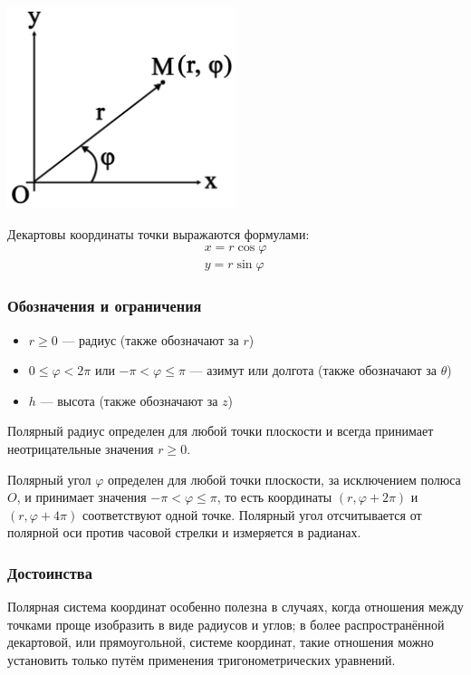 \documentclass[a4paper,12pt]{extbook}
\theoremstyle{named}
\theoremstyle{named}
\begin{document}
\begin{center}
    \includegraphics[width=0.5\textwidth]{polar_system.png}
\end{center}

Декартовы координаты точки выражаются формулами:
\begin{gather*}
    x = r \cos{\varphi} \\
    y = r \sin{\varphi}
\end{gather*}

\subsubsection*{Обозначения и ограничения}
\begin{itemize}
    \item {\(r \geq 0\) — радиус (также обозначают за \(r\))}
    \item {\(0 \leq \varphi < 2\pi\) или \(-\pi < \varphi \leq \pi\) — азимут или долгота (также обозначают за \(\theta\))}
    \item {\(h\) — высота (также обозначают за \(z\))}
\end{itemize}

Полярный радиус определен для любой точки плоскости и всегда принимает неотрицательные значения \(r \geq 0\).

Полярный угол \(\varphi\) определен для любой точки плоскости, за исключением полюса \(O\), и принимает значения \(-\pi < \varphi \leq \pi\), то есть координаты \((r, \varphi + 2\pi)\) и  \((r, \varphi + 4\pi)\) соответствуют одной точке.
Полярный угол отсчитывается от полярной оси против часовой стрелки и измеряется в радианах.

\subsubsection*{Достоинства}
Полярная система координат особенно полезна в случаях, когда отношения между точками проще изобразить в виде радиусов и углов; в более распространённой декартовой, или прямоугольной, системе координат, такие отношения можно установить только путём применения тригонометрических уравнений.
\end{document}
